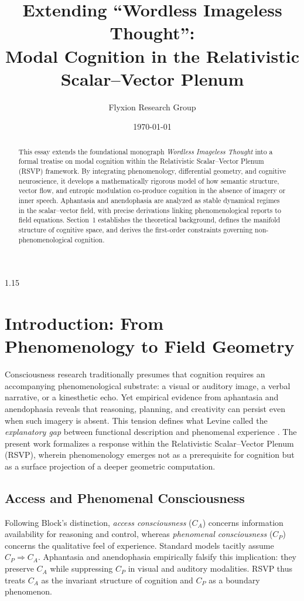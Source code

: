 \documentclass[12pt,a4paper]{article}
\title{Extending ``Wordless Imageless Thought'':\\ Modal Cognition in the Relativistic Scalar--Vector Plenum}
\author{Flyxion Research Group}
\date{\today}
\begin{document}
\maketitle
\begin{spacing}{1.15}

\begin{abstract}
This essay extends the foundational monograph \emph{Wordless Imageless Thought} into a formal treatise on modal cognition within the Relativistic Scalar--Vector Plenum (RSVP) framework. By integrating phenomenology, differential geometry, and cognitive neuroscience, it develops a mathematically rigorous model of how semantic structure, vector flow, and entropic modulation co-produce cognition in the absence of imagery or inner speech. Aphantasia and anendophasia are analyzed as stable dynamical regimes in the scalar--vector field, with precise derivations linking phenomenological reports to field equations. Section~1 establishes the theoretical background, defines the manifold structure of cognitive space, and derives the first-order constraints governing non-phenomenological cognition.
\end{abstract}

\section{Introduction: From Phenomenology to Field Geometry}

Consciousness research traditionally presumes that cognition requires an accompanying phenomenological substrate: a visual or auditory image, a verbal narrative, or a kinesthetic echo. Yet empirical evidence from aphantasia and anendophasia reveals that reasoning, planning, and creativity can persist even when such imagery is absent. This tension defines what Levine called the \emph{explanatory gap} between functional description and phenomenal experience \cite{levine1983}. The present work formalizes a response within the Relativistic Scalar--Vector Plenum (RSVP), wherein phenomenology emerges not as a prerequisite for cognition but as a surface projection of a deeper geometric computation.

\subsection{Access and Phenomenal Consciousness}

Following Block’s distinction, \emph{access consciousness} (\(C_A\)) concerns information availability for reasoning and control, whereas \emph{phenomenal consciousness} (\(C_P\)) concerns the qualitative feel of experience. Standard models tacitly assume \(C_P \Rightarrow C_A\). Aphantasia and anendophasia empirically falsify this implication: they preserve \(C_A\) while suppressing \(C_P\) in visual and auditory modalities. RSVP thus treats \(C_A\) as the invariant structure of cognition and \(C_P\) as a boundary phenomenon.


\end{spacing}
\end{document}
